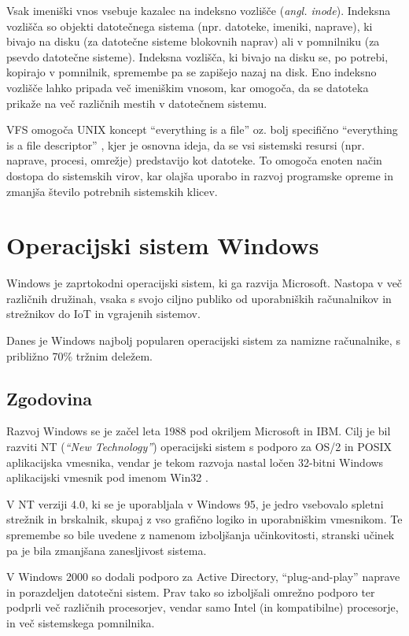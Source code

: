 \documentclass[a4paper,12pt,openright]{book}
\begin{document}
Vsak imeniški vnos vsebuje kazalec na indeksno vozlišče (\textit{angl. inode}). Indeksna vozlišča so objekti datotečnega sistema (npr. datoteke, imeniki, naprave), ki bivajo na disku (za datotečne sisteme blokovnih naprav) ali v pomnilniku (za psevdo datotečne sisteme).
Indeksna vozlišča, ki bivajo na disku se, po potrebi, kopirajo v pomnilnik, spremembe pa se zapišejo nazaj na disk.
Eno indeksno vozlišče lahko pripada več imeniškim vnosom, kar omogoča, da se datoteka prikaže na več različnih mestih v datotečnem sistemu.

VFS omogoča UNIX koncept ``everything is a file'' \cite{Garrels_2008} oz. bolj specifično ``everything is a file descriptor'' \cite{LWN_Brown_2010}, kjer je osnovna ideja, da se vsi sistemski resursi (npr. naprave, procesi, omrežje) predstavijo kot datoteke.
To omogoča enoten način dostopa do sistemskih virov, kar olajša uporabo in razvoj programske opreme in zmanjša število potrebnih sistemskih klicev.

\section{Operacijski sistem Windows}

Windows je zaprtokodni operacijski sistem, ki ga razvija Microsoft.
Nastopa v več različnih družinah, vsaka s svojo ciljno publiko od uporabniških računalnikov in strežnikov do IoT in vgrajenih sistemov.

Danes je Windows najbolj popularen operacijski sistem za namizne računalnike, s približno 70\% tržnim deležem.

\subsection{Zgodovina}

Razvoj Windows se je začel leta 1988 pod okriljem Microsoft in IBM.
Cilj je bil razviti NT (\textit{``New Technology''}) operacijski sistem s podporo za OS/2 in POSIX aplikacijska vmesnika, vendar je tekom razvoja nastal ločen 32-bitni Windows aplikacijski vmesnik pod imenom Win32 \cite{Silberschatz_Galvin_Gagne_2018}.

V NT verziji 4.0, ki se je uporabljala v Windows 95, je jedro vsebovalo spletni strežnik in brskalnik, skupaj z vso grafično logiko in uporabniškim vmesnikom.
Te spremembe so bile uvedene z namenom izboljšanja učinkovitosti, stranski učinek pa je bila zmanjšana zanesljivost sistema.

V Windows 2000 so dodali podporo za Active Directory, ``plug-and-play'' naprave in porazdeljen datotečni sistem.
Prav tako so izboljšali omrežno podporo ter podprli več različnih procesorjev, vendar samo Intel (in kompatibilne) procesorje, in več sistemskega pomnilnika.
\end{document}
